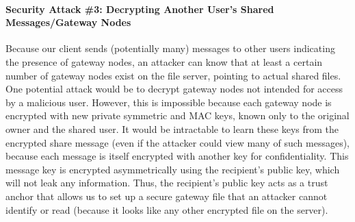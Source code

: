 \documentclass[12pt]{exam}
\begin{document}
\paragraph{Security Attack \#3: Decrypting Another User's Shared Messages/Gateway Nodes} Because our client sends (potentially many) messages to other users indicating the presence of gateway nodes, an attacker can know that at least a certain number of gateway nodes exist on the file server, pointing to actual shared files. One potential attack would be to decrypt gateway nodes not intended for access by a malicious user. However, this is impossible because each gateway node is encrypted with new private symmetric and MAC keys, known only to the original owner and the shared user. It would be intractable to learn these keys from the encrypted share message (even if the attacker could view many of such messages), because each message is itself encrypted with another key for confidentiality. This message key is encrypted asymmetrically using the recipient's public key, which will not leak any information. Thus, the recipient's public key acts as a trust anchor that allows us to set up a secure gateway file that an attacker cannot identify or read (because it looks like any other encrypted file on the server).
\end{document}
